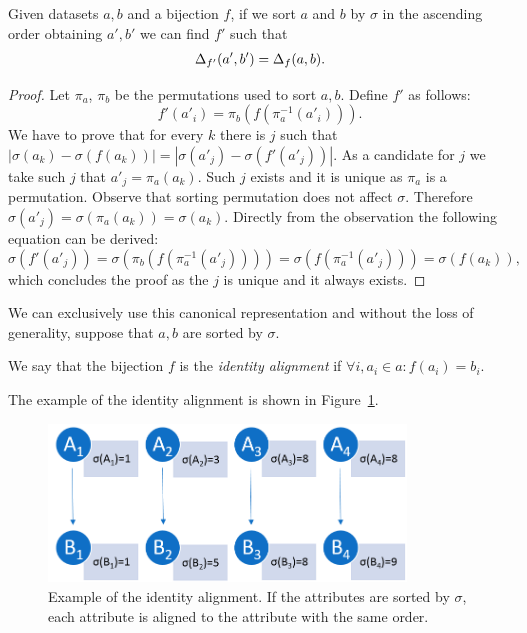 \begin{theorem}
Given datasets $a,b$ and a bijection $f$, if we sort $a$ and $b$ by $\sigma$ in the ascending order obtaining $a',b'$ we can find $f'$ such that
\begin{equation}
\Delta_{f'}(a',b')=\Delta_f(a,b).
\label{eq:df}
\end{equation}
\end{theorem}
\begin{proof}
Let $\pi _{a}$, $\pi _{b}$ be the permutations used to sort $a,b$. Define $f'$ as follows:
\begin{equation}
f'(a'_i)=\pi _{b}(f(\pi _{a}^{-1}(a'_i))).
\label{eq:fai}
\end{equation}
We have to prove that for every $k$ there is $j$ such that $|\sigma(a_k)-\sigma(f(a_k))|=|\sigma(a'_j)-\sigma(f'(a'_j))|$. As a candidate for $j$ we take such $j$ that $a'_j=\pi_{a}(a_k).$ Such $j$ exists and it is unique as $\pi_{a}$ is a permutation. Observe that sorting permutation does not affect $\sigma.$ Therefore $\sigma(a'_j)=\sigma(\pi_{a}(a_k))=\sigma(a_k).$ %
Directly from the observation the following equation can be derived: 
\begin{equation}
\sigma(f'(a'_j))=\sigma(\pi _{b}(f(\pi _{a}^{-1}(a'_j))))= \sigma(f(\pi _{a}^{-1}(a'_j)))=\sigma(f(a_k)),
\label{eq:faj}
\end{equation}
which concludes the proof as the $j$ is unique and it always exists.
\end{proof}

\begin{corollary}
We can exclusively use this canonical representation and without the loss of generality, suppose that $a,b$ are sorted by $\sigma$.
\end{corollary}

\begin{definition}
We say that the bijection $f$ is the \emph{identity alignment} if $\forall i,a_i \in a:f(a_i)=b_i$. 
\end{definition}
The example of the identity alignment is shown in Figure~\ref{fig:identity}.
\begin{figure}
	\includegraphics[width=9.5cm]{Images/identity.png}
		\centering
	\caption{Example of the identity alignment. If the attributes are sorted by $\sigma$, each attribute is aligned to the attribute with the same order.}
	\label{fig:identity}	
\end{figure}

